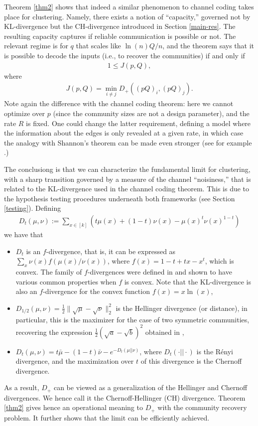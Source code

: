 \documentclass[11pt]{article}
\newcommand{\dd}{D_+}
\newcommand{\1}{\mathbb{1}}
\begin{document}
Theorem \ref{thm2} shows that indeed a similar phenomenon to channel coding takes place for clustering. Namely, there exists a notion of ``capacity,'' governed not by KL-divergence but the CH-divergence introduced in Section \ref{main-res}. The resulting capacity captures if reliable communication is possible or not. The relevant regime is for $q$ that scales like $\ln(n)Q/n$, and the theorem says that it is possible to decode the inputs (i.e., to recover the communities) if and only if 
\begin{align}
1 \leq J(p,Q),
\end{align} 
where 
\begin{align}
J(p,Q)= \min_{i\neq j} \dd((pQ)_i,(pQ)_j).
\end{align} 
Note again the difference with the channel coding theorem: here we cannot optimize over $p$ (since the community sizes are not a design parameter), and the rate $R$ is fixed. One could change the latter requirement, defining a model where the information about the edges is only revealed at a given rate, in which case the analogy with Shannon's theorem can be made even stronger (see for example \cite{abbs}.) 

The conclusiong is that we can characterize the fundamental limit for clustering, with a sharp transition governed by a measure of the channel ``noisiness,'' that is related to the KL-divergence used in the channel coding theorem. This is due to the hypothesis testing procedures underneath both frameworks (see Section \ref{testing}). 
Defining
\begin{align} 
D_t(\mu,\nu):= \sum_{x \in [k]} \left(  t\mu(x) + (1-t)\nu(x)- \mu(x)^t \nu(x)^{1-t}  \right) 
\end{align}
we have that 
\begin{itemize}
\item $D_t$ is an $f$-divergence, that is, it can be expressed as $\sum_x \nu(x) f(\mu(x)/\nu(x))$, where $f(x)=1-t+tx-x^t$, which is convex. The family of $f$-divergences were defined in \cite{csiszar-f,morimoto,ali} and shown to have various common properties when $f$ is convex. Note that the KL-divergence is also an $f$-divergence for the convex function $f(x)=x\ln(x)$,
\item $D_{1/2}(\mu,\nu)=\frac{1}{2} \| \sqrt{\mu} - \sqrt{\nu} \|_2^2$ is the Hellinger divergence (or distance), in particular, this is the maximizer for the case of two symmetric communities, recovering the expression $\frac{1}{2}(\sqrt{a}-\sqrt{b})^2$ obtained in \cite{abh,mossel-consist},
\item $D_t(\mu,\nu)=t \bar{\mu} - (1-t) \bar{\nu} - e^{-D_t(\mu||\nu)}$, where $D_t(\cdot || \cdot)$ is the R\'enyi divergence, and the maximization over $t$ of this divergence is the Chernoff divergence.
\end{itemize}
As a result, $D_+$ can be viewed as a generalization of the Hellinger and Chernoff divergences. We hence call it the Chernoff-Hellinger (CH) divergence. Theorem \ref{thm2} gives hence an operational meaning to $\dd$ with the community recovery problem.  It further shows that the limit can be efficiently achieved. 
\end{document}
